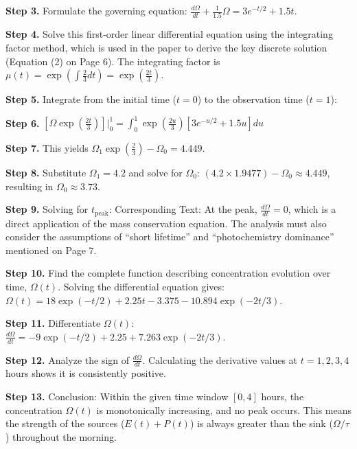 \begin{tcolorbox}[
    breakable,
    title=Example of Scientific Deep Research in Earth,
    colback=LighterGray,
    colframe=DeepPurple,
    colbacktitle=DeepPurple,
    coltitle=White,
]
\textbf{\textcolor{CaseOrange}{Step 3.}} Formulate the governing equation: $\frac{d\Omega}{dt} + \frac{1}{1.5}\Omega = 3e^{-t/2} + 1.5t$.

\textbf{\textcolor{CaseOrange}{Step 4.}} Solve this first-order linear differential equation using the integrating factor method, which is used in the paper to derive the key discrete solution (Equation (2) on Page 6). The integrating factor is $\mu(t) = \exp\left(\int \frac{2}{3}dt\right) = \exp\left(\frac{2t}{3}\right)$.

\textbf{\textcolor{CaseOrange}{Step 5.}} Integrate from the initial time ($t=0$) to the observation time ($t=1$):

\textbf{\textcolor{CaseOrange}{Step 6.}} $\left[\Omega \exp\left(\frac{2t}{3}\right)\right] \Big|_0^1 = \int_0^1 \exp\left(\frac{2u}{3}\right)\left[3e^{-u/2} + 1.5u\right] du$

\textbf{\textcolor{CaseOrange}{Step 7.}} This yields $\Omega_1 \exp\left(\frac{2}{3}\right) - \Omega_0 = 4.449$.

\textbf{\textcolor{CaseOrange}{Step 8.}} Substitute $\Omega_1 = 4.2$ and solve for $\Omega_0$: $(4.2 \times 1.9477) - \Omega_0 \approx 4.449$, resulting in $\Omega_0 \approx 3.73$.

\textbf{\textcolor{CaseOrange}{Step 9.}} Solving for $t_{\text{peak}}$: Corresponding Text: At the peak, $\frac{d\Omega}{dt} = 0$, which is a direct application of the mass conservation equation. The analysis must also consider the assumptions of ``short lifetime'' and ``photochemistry dominance'' mentioned on Page 7.

\textbf{\textcolor{CaseOrange}{Step 10.}} Find the complete function describing concentration evolution over time, $\Omega(t)$. Solving the differential equation gives: $\Omega(t) = 18\exp(-t/2) + 2.25t - 3.375 - 10.894\exp(-2t/3)$.

\textbf{\textcolor{CaseOrange}{Step 11.}} Differentiate $\Omega(t)$: $\frac{d\Omega}{dt} = -9\exp(-t/2) + 2.25 + 7.263\exp(-2t/3)$.

\textbf{\textcolor{CaseOrange}{Step 12.}} Analyze the sign of $\frac{d\Omega}{dt}$. Calculating the derivative values at $t=1, 2, 3, 4$ hours shows it is consistently positive.

\textbf{\textcolor{CaseOrange}{Step 13.}} Conclusion: Within the given time window $[0, 4]$ hours, the concentration $\Omega(t)$ is monotonically increasing, and no peak occurs. This means the strength of the sources ($E(t) + P(t)$) is always greater than the sink ($\Omega/\tau$) throughout the morning.


\end{tcolorbox}
